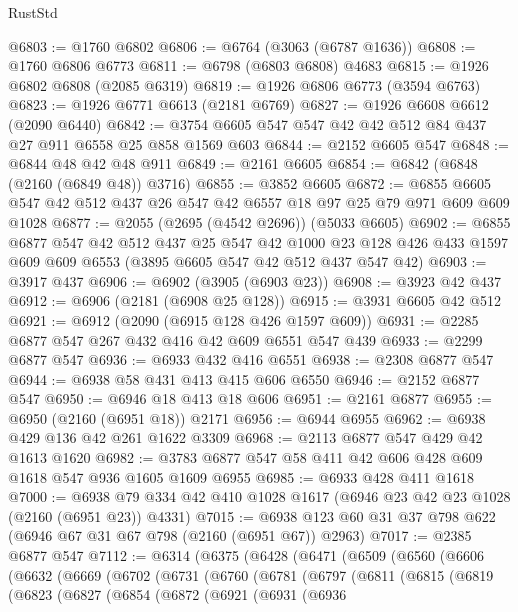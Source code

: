 \begin{lexlean}{RustStd}
\begin{coremodule}
@6803 := @1760 @6802
@6806 := @6764 (@3063 (@6787 @1636))
@6808 := @1760 @6806 @6773
@6811 := @6798 (@6803 @6808) @4683
@6815 := @1926 @6802 @6808 (@2085 @6319)
@6819 := @1926 @6806 @6773 (@3594 @6763)
@6823 := @1926 @6771 @6613 (@2181 @6769)
@6827 := @1926 @6608 @6612 (@2090 @6440)
@6842 := @3754 @6605 @547 @547 @42 @42 @512 @84 @437 @27 @911 @6558 @25 @858 @1569 @603
@6844 := @2152 @6605 @547
@6848 := @6844 @48 @42 @48 @911
@6849 := @2161 @6605
@6854 := @6842 (@6848 (@2160 (@6849 @48)) @3716)
@6855 := @3852 @6605
@6872 := @6855 @6605 @547 @42 @512 @437 @26 @547 @42 @6557 @18 @97 @25 @79 @971 @609 @609 @1028
@6877 := @2055 (@2695 (@4542 @2696)) (@5033 @6605)
@6902 := @6855
    @6877
    @547
    @42
    @512
    @437
    @25
    @547
    @42
    @1000
    @23
    @128
    @426
    @433
    @1597
    @609
    @609
    @6553
    (@3895 @6605 @547 @42 @512 @437 @547 @42)
@6903 := @3917 @437
@6906 := @6902 (@3905 (@6903 @23))
@6908 := @3923 @42 @437
@6912 := @6906 (@2181 (@6908 @25 @128))
@6915 := @3931 @6605 @42 @512
@6921 := @6912 (@2090 (@6915 @128 @426 @1597 @609))
@6931 := @2285 @6877 @547 @267 @432 @416 @42 @609 @6551 @547 @439
@6933 := @2299 @6877 @547
@6936 := @6933 @432 @416 @6551
@6938 := @2308 @6877 @547
@6944 := @6938 @58 @431 @413 @415 @606 @6550
@6946 := @2152 @6877 @547
@6950 := @6946 @18 @413 @18 @606
@6951 := @2161 @6877
@6955 := @6950 (@2160 (@6951 @18)) @2171
@6956 := @6944 @6955
@6962 := @6938 @429 @136 @42 @261 @1622 @3309
@6968 := @2113 @6877 @547 @429 @42 @1613 @1620
@6982 := @3783 @6877 @547 @58 @411 @42 @606 @428 @609 @1618 @547 @936 @1605 @1609 @6955
@6985 := @6933 @428 @411 @1618
@7000 := @6938 @79 @334 @42 @410 @1028 @1617 (@6946 @23 @42 @23 @1028 (@2160 (@6951 @23)) @4331)
@7015 := @6938 @123 @60 @31 @37 @798 @622 (@6946 @67 @31 @67 @798 (@2160 (@6951 @67)) @2963)
@7017 := @2385 @6877 @547
@7112 := @6314
    (@6375
      (@6428
        (@6471
          (@6509
            (@6560
              (@6606
                (@6632
                  (@6669
                    (@6702
                      (@6731
                        (@6760
                          (@6781
                            (@6797
                              (@6811
                                (@6815
                                  (@6819
                                    (@6823
                                      (@6827
                                        (@6854
                                          (@6872
                                            (@6921
                                              (@6931
                                                (@6936

\end{coremodule}
\end{lexlean}
